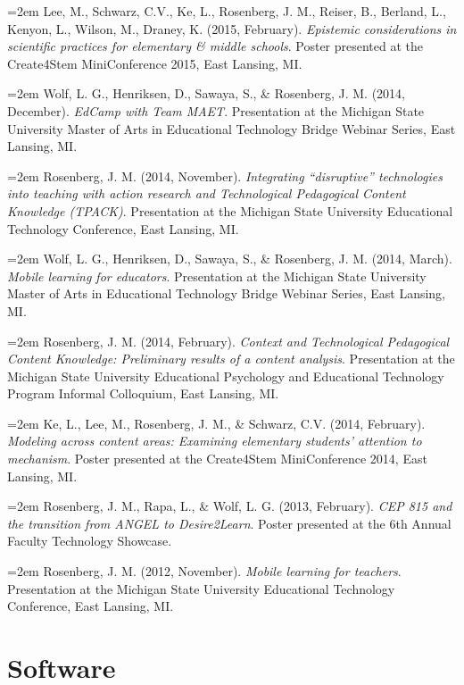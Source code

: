 \documentclass[
  14,
]{article}
\begin{document}
\hangindent=2em Lee, M., Schwarz, C.V., Ke, L., Rosenberg, J. M.,
Reiser, B., Berland, L., Kenyon, L., Wilson, M., Draney, K. (2015,
February). \emph{Epistemic considerations in scientific practices for
elementary \& middle schools}. Poster presented at the Create4Stem
MiniConference 2015, East Lansing, MI.

\hangindent=2em Wolf, L. G., Henriksen, D., Sawaya, S., \& Rosenberg, J.
M. (2014, December). \emph{EdCamp with Team MAET}. Presentation at the
Michigan State University Master of Arts in Educational Technology
Bridge Webinar Series, East Lansing, MI.

\hangindent=2em Rosenberg, J. M. (2014, November). \emph{Integrating
``disruptive'' technologies into teaching with action research and
Technological Pedagogical Content Knowledge (TPACK)}. Presentation at
the Michigan State University Educational Technology Conference, East
Lansing, MI.

\hangindent=2em Wolf, L. G., Henriksen, D., Sawaya, S., \& Rosenberg, J.
M. (2014, March). \emph{Mobile learning for educators}. Presentation at
the Michigan State University Master of Arts in Educational Technology
Bridge Webinar Series, East Lansing, MI.

\hangindent=2em Rosenberg, J. M. (2014, February). \emph{Context and
Technological Pedagogical Content Knowledge: Preliminary results of a
content analysis}. Presentation at the Michigan State University
Educational Psychology and Educational Technology Program Informal
Colloquium, East Lansing, MI.

\hangindent=2em Ke, L., Lee, M., Rosenberg, J. M., \& Schwarz, C.V.
(2014, February). \emph{Modeling across content areas: Examining
elementary students' attention to mechanism}. Poster presented at the
Create4Stem MiniConference 2014, East Lansing, MI.

\hangindent=2em Rosenberg, J. M., Rapa, L., \& Wolf, L. G. (2013,
February). \emph{CEP 815 and the transition from ANGEL to Desire2Learn}.
Poster presented at the 6th Annual Faculty Technology Showcase.

\hangindent=2em Rosenberg, J. M. (2012, November). \emph{Mobile learning
for teachers}. Presentation at the Michigan State University Educational
Technology Conference, East Lansing, MI.

\hypertarget{software}{%
\section{Software}\label{software}}
\end{document}

